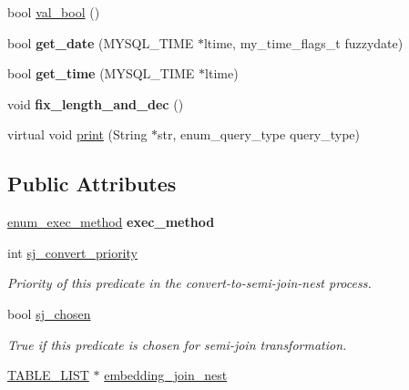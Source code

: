 \begin{DoxyCompactItemize}
\item 
bool \mbox{\hyperlink{classItem__exists__subselect_a2ca1dbb0f70d442c43e5360933a5a44d}{val\+\_\+bool}} ()
\item 
\mbox{\label{classItem__exists__subselect_a553ee303d00e2c4b3b5e8ed178e49331}} 
bool {\bfseries get\+\_\+date} (M\+Y\+S\+Q\+L\+\_\+\+T\+I\+ME $\ast$ltime, my\+\_\+time\+\_\+flags\+\_\+t fuzzydate)
\item 
\mbox{\label{classItem__exists__subselect_a451c8de73c996f72a5981c40030ef59b}} 
bool {\bfseries get\+\_\+time} (M\+Y\+S\+Q\+L\+\_\+\+T\+I\+ME $\ast$ltime)
\item 
\mbox{\label{classItem__exists__subselect_a209a429e4887b2b09459e17778d68192}} 
void {\bfseries fix\+\_\+length\+\_\+and\+\_\+dec} ()
\item 
virtual void \mbox{\hyperlink{classItem__exists__subselect_a795c650acea24859e6ff1d6f82d5a2ec}{print}} (String $\ast$str, enum\+\_\+query\+\_\+type query\+\_\+type)
\end{DoxyCompactItemize}
\subsection*{Public Attributes}
\begin{DoxyCompactItemize}
\item 
\mbox{\label{classItem__exists__subselect_a0f4105e279ccba88f36d398b5b559b71}} 
\mbox{\hyperlink{classItem__exists__subselect_aa110ca13dba0d9c620f5f72e6bad798e}{enum\+\_\+exec\+\_\+method}} {\bfseries exec\+\_\+method}
\item 
\mbox{\label{classItem__exists__subselect_a7a1f771a5f48916ee734537fac7d3b7e}} 
int \mbox{\hyperlink{classItem__exists__subselect_a7a1f771a5f48916ee734537fac7d3b7e}{sj\+\_\+convert\+\_\+priority}}
\begin{DoxyCompactList}\small\item\em Priority of this predicate in the convert-\/to-\/semi-\/join-\/nest process. \end{DoxyCompactList}\item 
\mbox{\label{classItem__exists__subselect_a7511edc96cdbae1f524b6c1581564d9c}} 
bool \mbox{\hyperlink{classItem__exists__subselect_a7511edc96cdbae1f524b6c1581564d9c}{sj\+\_\+chosen}}
\begin{DoxyCompactList}\small\item\em True if this predicate is chosen for semi-\/join transformation. \end{DoxyCompactList}\item 
\mbox{\hyperlink{structTABLE__LIST}{T\+A\+B\+L\+E\+\_\+\+L\+I\+ST}} $\ast$ \mbox{\hyperlink{classItem__exists__subselect_a7673d8a6fa6fd258b50580afc67839d3}{embedding\+\_\+join\+\_\+nest}}
\end{DoxyCompactItemize}
